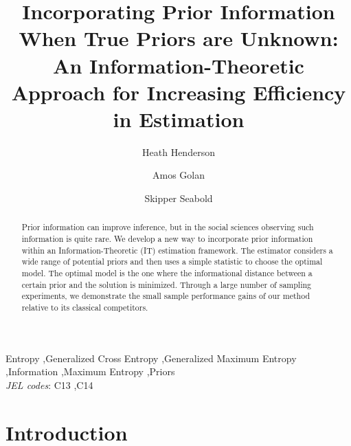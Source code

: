 \documentclass{elsarticle}
\begin{document}
\begin{frontmatter}

\title{Incorporating Prior Information When True Priors are Unknown: An 
Information-Theoretic Approach for Increasing Efficiency in Estimation}

\author[hh]{Heath Henderson}
\author[ag]{Amos Golan}
\author[ss]{Skipper Seabold}

\address[hh]{Department of Economics, Iowa State University}
\address[ag]{Info-Metrics Institute and Department of Economics, 
American University}
\address[ss]{Department of Economics, American University}

\begin{abstract}
Prior information can improve inference, but in the social sciences observing such
information is quite rare.
We develop a new way to incorporate prior information within an 
Information-Theoretic (IT) estimation framework. 
The estimator considers a wide range of potential priors and then uses a simple statistic 
to choose the optimal model. 
The optimal model is the one where the informational distance between a certain prior and 
the solution is minimized.
Through a large number of sampling experiments, we demonstrate the small sample 
performance gains of our method relative to its classical competitors.
\end{abstract}

\begin{keyword}
Entropy \sep Generalized Cross Entropy  \sep Generalized Maximum Entropy 
\sep Information \sep Maximum Entropy \sep Priors \\
\textit{JEL codes}: C13 \sep C14  
\end{keyword}

\end{frontmatter}

\doublespacing


\section{Introduction}
\label{sec: intro}
\end{document}

